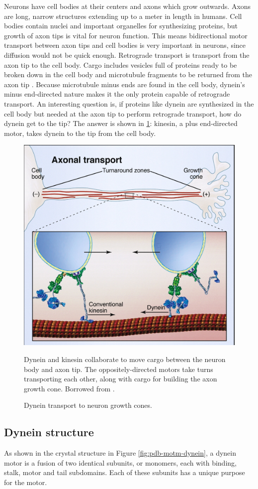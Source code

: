 \documentclass[
11pt, %
english, %
singlespacing, %
headsepline, %
chapterinoneline, %
]{MastersDoctoralThesis} %
\begin{document}
Neurons have cell bodies at their centers and axons which grow outwards. Axons are long, narrow structures extending up to a meter in length in humans. Cell bodies contain nuclei and important organelles for synthesizing proteins, but growth of axon tips is vital for neuron function. This means bidirectional motor transport between axon tips and cell bodies is very important in neurons, since diffusion would not be quick enough. Retrograde transport is transport from the axon tip to the cell body. Cargo includes vesicles full of proteins ready to be broken down in the cell body and microtubule fragments to be returned from the axon tip \cite{neuroanatomy}. Because microtubule minus ends are found in the cell body, dynein's minus end-directed nature makes it the only protein capable of retrograde transport. An interesting question is, if proteins like dynein are synthesized in the cell body but needed at the axon tip to perform retrograde transport, how do dynein get to the tip? The answer is shown in \ref{retrograde-transport}: kinesin, a plus end-directed motor, takes dynein to the tip from the cell body.\\

\begin{figure}[h]
  \centering
  \includegraphics[width=.65\textwidth,keepaspectratio]{../../figures/retrograde_transport.jpg}
  \caption{Dynein transport to neuron growth cones.}{Dynein and kinesin collaborate to move cargo between the neuron body and axon tip. The oppositely-directed motors take turns transporting each other, along with cargo for building the axon growth cone. Borrowed from \cite{valetoolbox}.}
  \label{retrograde-transport}
\end{figure}

\subsection{Dynein structure}
As shown in the crystal structure in Figure \ref{fig:pdb-motm-dynein}, a dynein motor is a fusion of two identical subunits, or monomers, each with binding, stalk, motor and tail subdomains. Each of these subunits has a unique purpose for the motor.
\end{document}
